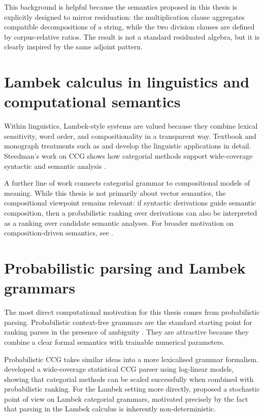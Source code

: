 This background is helpful because the semantics proposed in this thesis is explicitly designed to
mirror residuation: the multiplication clause aggregates compatible decompositions of a string,
while the two division clauses are defined by corpus-relative ratios. The result is not a standard
residuated algebra, but it is clearly inspired by the same adjoint pattern.


\section{Lambek calculus in linguistics and computational semantics}
Within linguistics, Lambek-style systems are valued because they combine lexical sensitivity,
word order, and compositionality in a transparent way. Textbook and monograph treatments
such as \citet{Morrill1994} and \citet{Moortgat1997} develop the linguistic applications in detail.
Steedman's work on CCG shows how categorial methods support wide-coverage syntactic and
semantic analysis \citep{Steedman2000}.

A further line of work connects categorial grammar to compositional models of meaning. While
this thesis is not primarily about vector semantics, the compositional viewpoint remains relevant:
if syntactic derivations guide semantic composition, then a probabilistic ranking over derivations
can also be interpreted as a ranking over candidate semantic analyses. For broader motivation on
composition-driven semantics, see \citet{CoeckeSadrzadehClark2010}.


\section{Probabilistic parsing and Lambek grammars}
The most direct computational motivation for this thesis comes from probabilistic parsing.
Probabilistic context-free grammars are the standard starting point for ranking parses in the
presence of ambiguity \citep{ManningSchutze1999}. They are attractive because they combine a
clear formal semantics with trainable numerical parameters.

Probabilistic CCG takes similar ideas into a more lexicalised grammar formalism.
\citet{ClarkCurran2007} developed a wide-coverage statistical CCG parser using log-linear models,
showing that categorial methods can be scaled successfully when combined with probabilistic
ranking. For the Lambek setting more directly, \citet{BonfanteDeGroote2004} proposed a
stochastic point of view on Lambek categorial grammars, motivated precisely by the fact that
parsing in the Lambek calculus is inherently non-deterministic.

